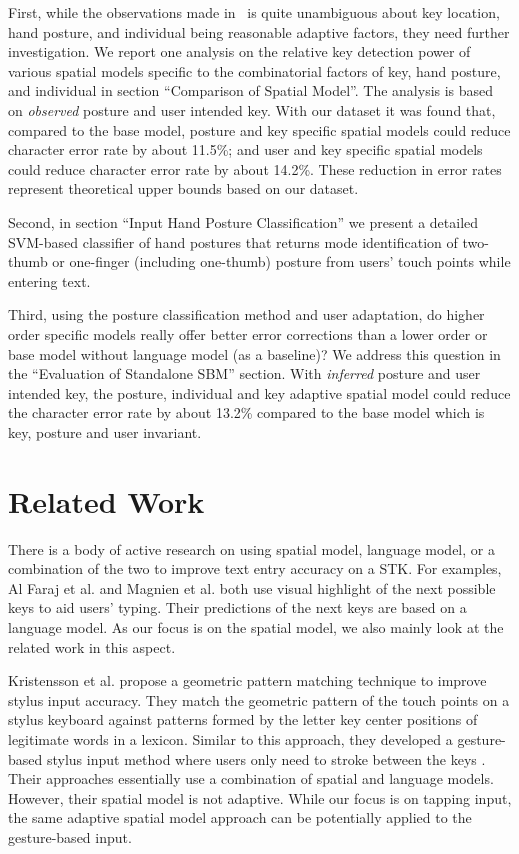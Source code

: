 \documentclass{sigchi}
\begin{document}
First, while the observations made in~\cite{Azenkot:2012} is quite unambiguous 
about key location, hand posture, and individual being reasonable adaptive 
factors, they need further investigation.  We report one analysis on the 
relative key detection power of various spatial models specific to the 
combinatorial factors of key, hand posture, and individual in section 
``Comparison of Spatial Model''. The analysis is based on \textit{observed} 
posture and user intended key. With our dataset it was found that, compared to
the base model, posture and key specific spatial models could reduce character
error rate by about 11.5\%; and user and key specific spatial models could
reduce character error rate by about 14.2\%. These reduction in error rates
represent theoretical upper bounds based on our dataset.

Second, in section ``Input Hand Posture Classification'' we present a detailed 
SVM-based classifier of hand postures that returns mode identification of 
two-thumb or one-finger (including one-thumb) posture from users' touch points while entering text.

Third, using the posture classification method and user adaptation, do higher 
order specific models really offer better error corrections than a lower order 
or base model without language model (as a baseline)? We address this question 
in the ``Evaluation of Standalone SBM'' section. With \textit{inferred} posture 
and user intended key, the posture, individual and key adaptive spatial model 
could reduce the character error rate by about 13.2\% compared to
the base model which is key, posture and user invariant.

\section{Related Work}

There is a body of active research on using spatial model, language model, or a combination
of the two to improve text entry accuracy on a STK. For examples, 
Al Faraj et al. \cite{AlFaraj:2009} and Magnien et al. \cite{Magnien:2004} both use
visual highlight of the next possible keys to aid users' typing. Their predictions of the next keys are based on a language model. As our focus is on the 
spatial model, we also mainly look at the related work in this aspect.    

Kristensson et al. \cite{Kristensson:2005} propose a geometric pattern matching technique to improve 
stylus input accuracy. They match the geometric pattern of the touch points on a stylus keyboard against patterns formed by 
the letter key center positions of legitimate words in a lexicon. Similar to this approach,
they developed a gesture-based stylus input method where users only need to stroke between the keys \cite{Kristensson:2004}.
Their approaches essentially use a combination of spatial and language models. However, 
their spatial model is not adaptive. While our focus is on tapping input, the same adaptive spatial model approach
can be potentially applied to the gesture-based input.
\end{document}
